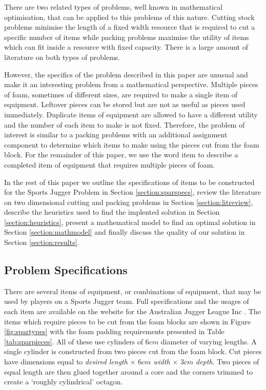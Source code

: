 \documentclass[10pt,a4paper]{article}
\begin{document}
There are two related types of problems, well known in mathematical optimisation, that can be applied to this problems of this nature. Cutting stock problems minimise the length of a fixed width resource that is required to cut a specific number of items while packing problems maximise the utility of items which can fit inside a resource with fixed capacity. There is a large amount of literature on both types of problems. 

However, the specifics of the problem described in this paper are unusual and make it an interesting problem from a mathematical perspective. Multiple pieces of foam, sometimes of different sizes, are required to make a single item of equipment. Leftover pieces can be stored but are not as useful as pieces used immediately. Duplicate items of equipment are allowed to have a different utility and the number of each item to make is not fixed. Therefore, the problem of interest is similar to a packing problems with an additional assignment component to determine which items to make using the pieces cut from the foam block. For the remainder of this paper, we use the word item to describe a completed item of equipment that requires multiple pieces of foam.

In the rest of this paper we outline the specifications of items to be constructed for the Sports Jugger Problem in Section \ref{section:sparspecs}, review the literature on two dimensional cutting and packing problems in Section \ref{section:litreview}, describe the heuristics used to find the implented solution in Section \ref{section:heuristics}, present a mathematical model to find an optimal solution in Section \ref{section:mathmodel} and finally discuss the quality of our solution in Section \ref{section:results}.

\subsection{Problem Specifications}
There are several items of equipment, or combinations of equipment, that may be used by players on a Sports Jugger team. Full specifications and the usages of each item are available on the website for the Australian Jugger League Inc \cite{AJLweb}. The items which require pieces to be cut from the foam blocks are shown in Figure \ref{fig:spartypes} with the foam padding requirements presented in Table \ref{tab:sparpieces}. All of these use cylinders of $6cm$ diameter of varying lengths. A single cylinder is constructed from two pieces cut from the foam block. Cut pieces have dimensions equal to \textit{desired length} $\times$ $6cm$ \textit{width} $\times$ $3cm$ \textit{depth}. Two pieces of equal length are then glued together around a core and the corners trimmed to create a `roughly cylindrical' octagon. 
\end{document}
